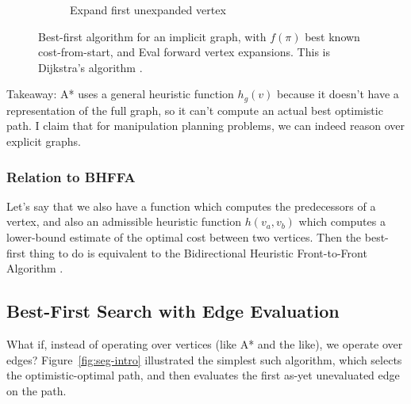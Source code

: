 \begin{figure}
\begin{subfigure}[b]{0.45\textwidth}
\caption{Expand first unexpanded vertex}
\end{subfigure}%
\caption{Best-first algorithm for an implicit graph,
   with $f(\pi)$ best known cost-from-start,
   and {\sc Eval} forward vertex expansions.
   This is Dijkstra's algorithm \cite{dijkstra1959anote}.}
\label{fig:seg-implicit}
\end{figure}

Takeaway: A* uses a general heuristic function $h_g(v)$
because it doesn't have a representation of the full graph,
so it can't compute an actual best optimistic path.
I claim that for manipulation planning problems,
we can indeed reason over explicit graphs.

\subsubsection{Relation to BHFFA}

Let's say that we also have a function which computes the predecessors
of a vertex,
and also an admissible heuristic function $h(v_a,v_b)$ which computes
a lower-bound estimate of the optimal cost between two vertices.
Then the best-first thing to do is equivalent to the
Bidirectional Heuristic Front-to-Front Algorithm \cite{sint1977bhffa}.

\subsection{Best-First Search with Edge Evaluation}

What if, instead of operating over vertices (like A* and the like),
we operate over edges?
Figure~\ref{fig:seg-intro} illustrated the simplest such algorithm,
which selects the optimistic-optimal path,
and then evaluates the first as-yet unevaluated edge on the path.

